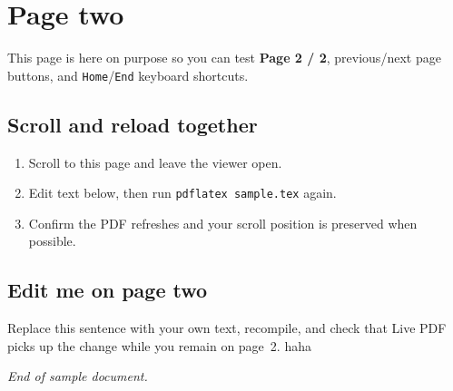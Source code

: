 \documentclass[11pt]{article}
\begin{document}
\newpage

\section{Page two}

This page is here on purpose so you can test \textbf{Page 2 / 2}, previous/next
page buttons, and \texttt{Home}/\texttt{End} keyboard shortcuts.

\subsection{Scroll and reload together}

\begin{enumerate}
  \item Scroll to this page and leave the viewer open.
  \item Edit text below, then run \texttt{pdflatex sample.tex} again.
  \item Confirm the PDF refreshes and your scroll position is preserved when possible.
\end{enumerate}

\subsection{Edit me on page two}

Replace this sentence with your own text, recompile, and check that Live PDF
picks up the change while you remain on page~2. haha~ 

\vfill
\begin{center}
\textit{End of sample document.}
\end{center}
\end{document}
